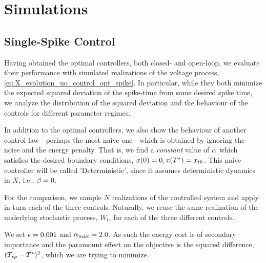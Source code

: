 
\section{Simulations} 
\subsection{Single-Spike Control}
\label{sec:probabilistic_numerical_test}
Having obtained the optimal controllers, both closed- and open-loop, we evaluate
their performance with simulated realizations of the voltage process,
\cref{eq:X_evolution_uo_control_opt_spike}. In particular, while they both minimize the expected
squared deviation of the spike-time from some desired spike time, we analyze
the distribution of the squared deviation and the behaviour of the
controls for different parameter regimes.

In addition to the optimal controllers, we also show the behaviour of
another control law - perhaps the most naive one - which is obtained by ignoring
the noise and the energy penalty. That is, we find a {\sl constant} value of
$\alpha$ which satisfies the desired boundary conditions, $x(0) = 0, x({ T^* }) = { x_{th} }$. This naive
controller will be called 'Deterministic', since it assumes deterministic
dynamics in $X$, i.e., $\beta = 0$.

For the comparison, we sample $N$ realizations of the controlled system
and apply in turn each of the three controls. Naturally, we reuse the same
realization of the underlying stochastic process, $W_t$, for each of the
three different controls.

We set ${\epsilon} = 0.001$ and ${ \alpha_{\textrm{max}} } = 2.0$. As such the energy cost is of secondary
importance and the paramount effect on the objective is the squared difference,
$(T_{sp} - { T^* })^2$, which we are trying to minimize.

